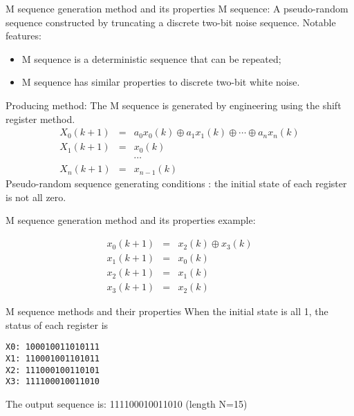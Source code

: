 \begin{frame}{M sequence generation method and its properties}
M sequence: A pseudo-random sequence constructed by truncating a discrete two-bit noise sequence.
Notable features:
\begin{itemize}
\item M sequence is a deterministic sequence that can be repeated;
\item M sequence has similar properties to discrete two-bit white noise.
\end{itemize}
Producing method: The M sequence is generated by engineering using the shift register method.
\begin{eqnarray*}
X_0(k+1)&=&a_0 x_0(k) \oplus a_1 x_1(k)\oplus \cdots \oplus a_n x_n(k) \\
X_1(k+1)&=& x_0(k) \\
&& \cdots \\
X_n(k+1)&=& x_{n-1}(k)
\end{eqnarray*}
Pseudo-random sequence generating conditions : the initial state of each register is not all zero.
\end{frame}


\begin{frame}{M sequence generation method and its properties}
example:
\begin{eqnarray*}
x_0(k+1)&=& x_2(k)\oplus x_3(k) \\
x_1(k+1)&=& x_0(k) \\
x_2(k+1)&=& x_1(k) \\
x_3(k+1)&=& x_2(k)
\end{eqnarray*}
\end{frame}

\begin{frame}[containsverbatim]{M sequence methods and their properties}
When the initial state is all 1, the status of each register is
\begin{verbatim}
X0: 100010011010111
X1: 110001001101011
X2: 111000100110101
X3: 111100010011010
\end{verbatim}
The output sequence is: 111100010011010 (length N=15)
\end{frame}

